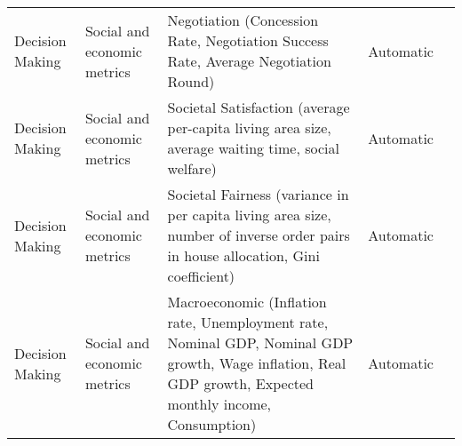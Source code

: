 \begin{small}
\begin{center}
\begin{longtable}{@{}p{}p{}p{}p{}p{}@{}}
Decision Making          & Social and economic metrics         & Negotiation (Concession Rate, Negotiation Success Rate, Average Negotiation Round)                                                                                                                          & Automatic & \cite{huang2024personality}                                                                                                                                                                                                                                                                                                                                                                                                 \\
Decision Making          & Social and economic metrics         & Societal Satisfaction (average per-capita living area size, average waiting time, social welfare)                                                                                                           & Automatic & \cite{ji2024srap}                                                                                                                                                                                                                                                                                                                                                                                   \\
Decision Making          & Social and economic metrics         & Societal Fairness (variance in per capita living area size, number of inverse order pairs in house allocation, Gini coefficient)                                                                            & Automatic & \cite{ji2024srap}                                                                                                                                                                                                                                                                                                                                                                                   \\
Decision Making          & Social and economic metrics         & Macroeconomic (Inflation rate, Unemployment rate, Nominal GDP, Nominal GDP growth, Wage inflation, Real GDP growth, Expected monthly income, Consumption)                                                   & Automatic & \cite{li2024econagent}                                                                                                                                                                                                                                                                                                                                                                                                 \\

\end{longtable}
\end{center}
\end{small}
